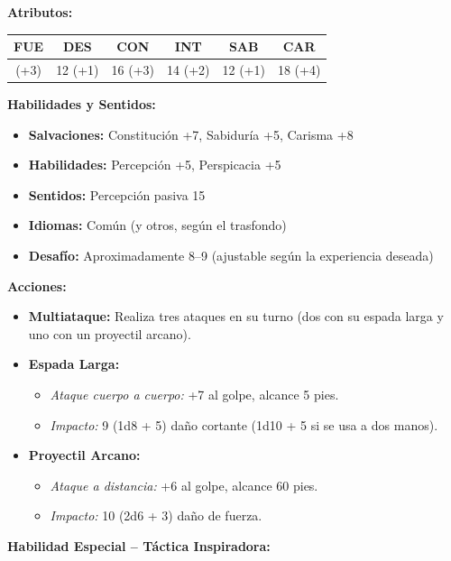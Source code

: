 \documentclass[
  twocolumn]{article}
\providecommand{\tightlist}{%
  \setlength{\itemsep}{0pt}\setlength{\parskip}{0pt}}
\begin{document}
\textbf{Atributos:}

\begin{longtable}[]{@{}cccccc@{}}
\toprule\noalign{}
FUE & DES & CON & INT & SAB & CAR \\
\midrule\noalign{}
\endhead
\bottomrule\noalign{}
\endlastfoot
16 (+3) & 12 (+1) & 16 (+3) & 14 (+2) & 12 (+1) & 18 (+4) \\
\end{longtable}

\textbf{Habilidades y Sentidos:}

\begin{itemize}
\tightlist
\item
  \textbf{Salvaciones:} Constitución +7, Sabiduría +5, Carisma +8
\item
  \textbf{Habilidades:} Percepción +5, Perspicacia +5
\item
  \textbf{Sentidos:} Percepción pasiva 15
\item
  \textbf{Idiomas:} Común (y otros, según el trasfondo)
\item
  \textbf{Desafío:} Aproximadamente 8--9 (ajustable según la experiencia
  deseada)
\end{itemize}

\textbf{Acciones:}

\begin{itemize}
\tightlist
\item
  \textbf{Multiataque:} Realiza tres ataques en su turno (dos con su
  espada larga y uno con un proyectil arcano).
\item
  \textbf{Espada Larga:}

  \begin{itemize}
  \tightlist
  \item
    \emph{Ataque cuerpo a cuerpo:} +7 al golpe, alcance 5 pies.
  \item
    \emph{Impacto:} 9 (1d8 + 5) daño cortante (1d10 + 5 si se usa a dos
    manos).
  \end{itemize}
\item
  \textbf{Proyectil Arcano:}

  \begin{itemize}
  \tightlist
  \item
    \emph{Ataque a distancia:} +6 al golpe, alcance 60 pies.
  \item
    \emph{Impacto:} 10 (2d6 + 3) daño de fuerza.
  \end{itemize}
\end{itemize}

\textbf{Habilidad Especial -- Táctica Inspiradora:}
\end{document}
